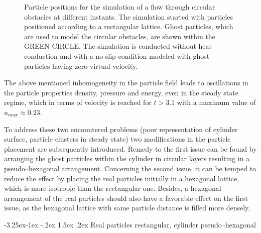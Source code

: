 \documentclass[11pt,a4paper,twoside]{report}
\makeatletter
\renewcommand\paragraph{\@startsection{paragraph}{4}{\z@}%
  {-3.25ex\@plus -1ex \@minus -.2ex}%
  {1.5ex \@plus .2ex}%
  {\normalfont\normalsize\bfseries}}
\makeatother
\begin{document}
\begin{figure}[h]
{}

\caption[particle positions for Porosities]{Particle positions for the simulation of a flow through circular obstacles at different instants. The simulation started with particles positioned according to a rectangular lattice. Ghost particles, which are used to model the circular obstacles, are shown within the GREEN CIRCLE. The simulation is conducted without heat conduction and with a no slip condition modeled with ghost particles having zero virtual velocity.}

\end{figure}

The above mentioned inhomogeneity in the particle field leads to oscillations in the particle properties density, pressure and energy, even in the steady state regime, which in terms of velocity is reached for $t>3.1$ with a maximum value of $u_\mathit{max}\approx 0.23$. 

To address these two encountered problems (poor representation of cylinder surface, particle clusters in steady state) two modifications in the particle placement are subsequently introduced. Remedy to the first issue can be found by arranging the ghost particles within the cylinder in circular layers resulting in a pseudo--hexagonal arrangement. Concerning the second issue, it can be temped to reduce the effect by placing the real particles initially in a hexagonal lattice, which is more isotropic than the rectangular one. Besides, a hexagonal arrangement of the real particles should also have a favorable effect on the first issue, as the hexagonal lattice with same particle distance is filled more densely.

\paragraph{Real particles rectangular, cylinder pseudo--hexagonal}
\end{document}
